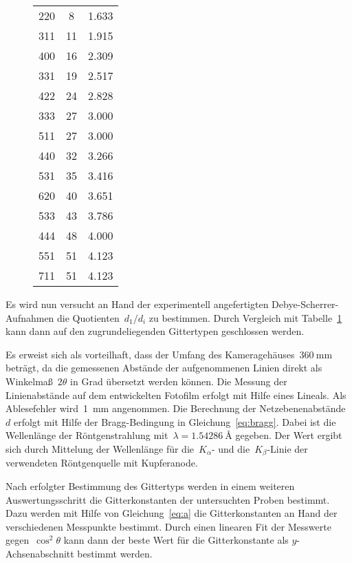 \begin{figure}[h]
\begin{subtable}{0.45\textwidth}
\begin{tabular}{S[table-format=3]
                    S[table-format=2]
                    S[table-format=1.3]}
      220 &  8 & 1.633 \\
      311 & 11 & 1.915 \\
      400 & 16 & 2.309 \\
      331 & 19 & 2.517 \\
      422 & 24 & 2.828 \\
      333 & 27 & 3.000 \\
      511 & 27 & 3.000 \\
      440 & 32 & 3.266 \\
      531 & 35 & 3.416 \\
      620 & 40 & 3.651 \\
      533 & 43 & 3.786 \\
      444 & 48 & 4.000 \\
      551 & 51 & 4.123 \\
      711 & 51 & 4.123 \\
      \bottomrule
    \end{tabular}
  \end{subtable}
  \label{tab:theorie}
\end{figure}

Es wird nun versucht an Hand der experimentell angefertigten
Debye-Scherrer-Aufnahmen die Quotienten~$d_1/d_i$ zu bestimmen. Durch Vergleich
mit Tabelle~\ref{tab:theorie} kann dann auf den zugrundeliegenden Gittertypen
geschlossen werden.

Es erweist sich als vorteilhaft, dass der Umfang des
Kameragehäuses~$\SI{360}{\milli\metre}$ beträgt, da die gemessenen Abstände der
aufgenommenen Linien direkt als Winkelmaß~$2\theta$ in Grad übersetzt werden
können. Die Messung der Linienabstände auf dem entwickelten Fotofilm erfolgt mit
Hilfe eines Lineals. Als Ablesefehler wird~\SI{1}{\milli\metre} angenommen. Die
Berechnung der Netzebenenabstände~$d$ erfolgt mit Hilfe der Bragg-Bedingung in
Gleichung~\eqref{eq:bragg}. Dabei ist die Wellenlänge der Röntgenstrahlung
mit~$\lambda=\SI{1.54286}{\angstrom}$ gegeben. Der Wert ergibt sich durch
Mittelung der Wellenlänge für die~$K_{\alpha}$- und die~$K_{\beta}$-Linie der
verwendeten Röntgenquelle mit Kupferanode.

Nach erfolgter Bestimmung des Gittertyps werden in einem weiteren
Auswertungsschritt die Gitterkonstanten der untersuchten Proben bestimmt. Dazu
werden mit Hilfe von Gleichung~\eqref{eq:a} die Gitterkonstanten an Hand der
verschiedenen Messpunkte bestimmt. Durch einen linearen Fit der Messwerte
gegen~$\cos^2\theta$ kann dann der beste Wert für die Gitterkonstante als
$y$-Achsenabschnitt bestimmt werden.

